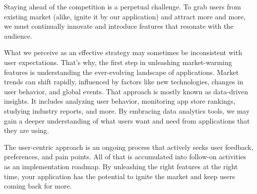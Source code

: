 
Staying ahead of the competition is a perpetual challenge. To grab users from existing market (alike, ignite it by our 
application) and attract more and more, we must continually innovate and introduce features that resonate with the
audience. 

What we perceive as an effective strategy may sometimes be inconsistent with user expectations. That's why, the first 
step in unleashing market-warming features is understanding the ever-evolving landscape of applications. Market trends 
can shift rapidly, influenced by factors like new technologies, changes in user behavior, and global events. That 
approach is mostly known as data-driven insights. It includes analyzing user behavior, monitoring app store rankings, 
studying industry reports, and more. By embracing data analytics tools, we may gain a deeper understanding of what 
users want and need from applications that they are using.

The user-centric approach is an ongoing process that actively seeks user feedback, preferences, and pain points. All of 
that is accumulated into follow-on activities as an implementation roadmap. By unleashing the right features at 
the right time, your application has the potential to ignite the market and keep users coming back for more.
